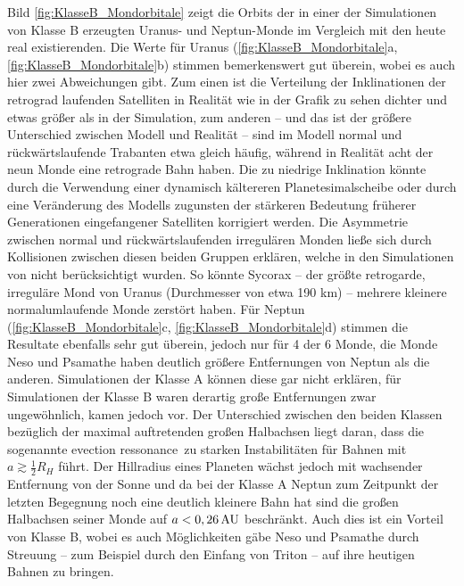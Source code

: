 \documentclass[12pt,a4paper,twoside]{article}
\renewcommand{\cite}{\citep}
\begin{document}
Bild \ref{fig:KlasseB_Mondorbitale} zeigt die Orbits der in einer der Simulationen von Klasse B erzeugten Uranus- und Neptun-Monde im Vergleich mit den heute real existierenden. %
Die Werte für Uranus (\ref{fig:KlasseB_Mondorbitale}a, \ref{fig:KlasseB_Mondorbitale}b) stimmen bemerkenswert gut überein, wobei es auch hier zwei %
Abweichungen gibt. Zum einen ist die Verteilung der Inklinationen der retrograd laufenden Satelliten in Realität wie in der Grafik zu sehen dichter und etwas größer als in der Simulation, 
zum anderen – und das ist der größere Unterschied zwischen Modell und Realität – sind im Modell normal und rückwärtslaufende Trabanten etwa gleich häufig, während in Realität acht der neun Monde eine retrograde Bahn haben\cite{Nesvorny2007}.
Die zu niedrige Inklination könnte durch die Verwendung einer dynamisch kältereren Planetesimalscheibe oder durch eine Veränderung des Modells zugunsten der stärkeren Bedeutung früherer Generationen eingefangener Satelliten korrigiert werden\cite{Nesvorny2007}. %
Die Asymmetrie zwischen normal und rückwärtslaufenden irregulären Monden ließe sich durch Kollisionen zwischen diesen beiden Gruppen erklären, welche in den Simulationen von \cite{Nesvorny2007} nicht berücksichtigt wurden. So könnte Sycorax – der größte retrogarde, irreguläre Mond von Uranus (Durchmesser von etwa 190 km) – mehrere kleinere normalumlaufende Monde zerstört haben\cite{Nesvorny2007}. %
Für Neptun (\ref{fig:KlasseB_Mondorbitale}c, \ref{fig:KlasseB_Mondorbitale}d) stimmen die Resultate ebenfalls sehr gut überein, jedoch nur für 4 der 6 Monde, die Monde Neso und Psamathe haben deutlich größere Entfernungen von Neptun als die anderen\cite{Nesvorny2007}.
Simulationen der Klasse A können diese gar nicht erklären, für Simulationen der Klasse B waren derartig große Entfernungen zwar ungewöhnlich, kamen jedoch vor.
Der Unterschied zwischen den beiden Klassen bezüglich der maximal auftretenden großen Halbachsen liegt daran, dass die sogenannte \glqq evection ressonance\grqq\ zu starken Instabilitäten für Bahnen mit $a \gtrsim \frac{1}{2} R_H$ führt\cite{Nesvorny2007}. %
Der Hillradius eines Planeten wächst jedoch mit wachsender Entfernung von der Sonne und da bei der Klasse A Neptun zum Zeitpunkt der letzten Begegnung noch eine deutlich kleinere Bahn hat sind die großen Halbachsen seiner Monde auf $a < \unit[0,26]{AU}$ beschränkt\cite{Nesvorny2007}.
Auch dies ist ein Vorteil von Klasse B, wobei es auch Möglichkeiten gäbe Neso und Psamathe durch Streuung – zum Beispiel durch den Einfang von Triton – auf ihre heutigen Bahnen zu bringen. %
\end{document}
